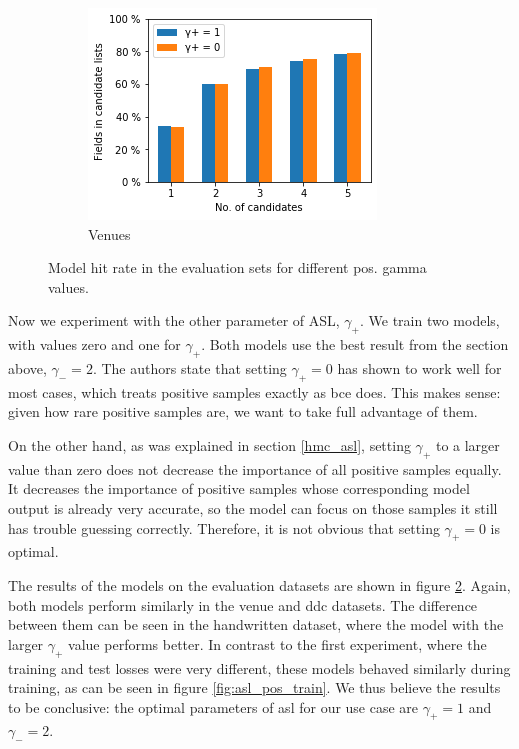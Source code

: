 \begin{figure}
\begin{subfigure}[t]{.32\textwidth}
    \includegraphics[width=\textwidth]{figures/supervised_approach/asl_pos_venue.png}
    \caption{Venues}
    \label{fig:asl_pos_venue}
  \end{subfigure}
  \caption{Model hit rate in the evaluation sets for different pos. gamma values.}
  \label{fig:asl_pos_eval}
\end{figure}

Now we experiment with the other parameter of ASL, $\gamma_+$. We train two models, with values zero and one for $\gamma_+$. Both models use the best result from the section above, $\gamma_-=2$. The authors state that setting $\gamma_+=0$ has shown to work well for most cases, which treats positive samples exactly as \acrshort{bce} does. This makes sense: given how rare positive samples are, we want to take full advantage of them.

On the other hand, as was explained in section \ref{hmc_asl}, setting $\gamma_+$ to a larger value than zero does not decrease the importance of all positive samples equally. It decreases the importance of positive samples whose corresponding model output is already very accurate, so the model can focus on those samples it still has trouble guessing correctly. Therefore, it is not obvious that setting $\gamma_+=0$ is optimal.

The results of the models on the evaluation datasets are shown in figure \ref{fig:asl_pos_eval}. Again, both models perform similarly in the venue and \acrshort{ddc} datasets. The difference between them can be seen in the handwritten dataset, where the model with the larger $\gamma_+$ value performs better. In contrast to the first experiment, where the training and test losses were very different, these models behaved similarly during training, as can be seen in figure \ref{fig:asl_pos_train}. We thus believe the results to be conclusive: the optimal parameters of \acrshort{asl} for our use case are $\gamma_+=1$ and $\gamma_-=2$.